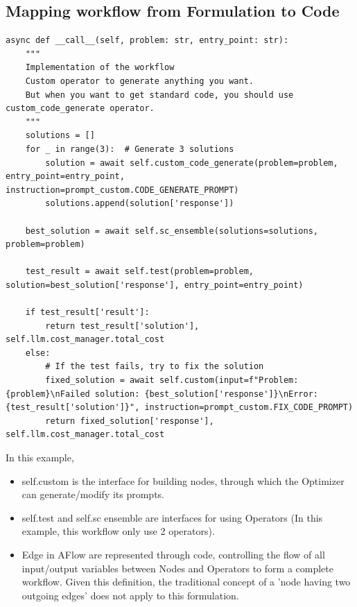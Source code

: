 \documentclass{article} %
\newcommand{\model}{{\sc AFlow}\xspace}
\theoremstyle{plain}
\theoremstyle{definition}
\theoremstyle{remark}
\begin{document}
\subsection{Mapping workflow from Formulation to Code}

\begin{tcolorbox}[title={\textbf{\small An example of Workflow}}, boxrule=1pt, arc=0mm, colback=black!5!white, colframe=black!75!white, breakable, before skip=10pt, after skip=10pt, pad at break=2mm, parbox=false] \begin{verbatim}
async def __call__(self, problem: str, entry_point: str):
    """
    Implementation of the workflow
    Custom operator to generate anything you want.
    But when you want to get standard code, you should use custom_code_generate operator.
    """
    solutions = []
    for _ in range(3):  # Generate 3 solutions
        solution = await self.custom_code_generate(problem=problem, entry_point=entry_point, instruction=prompt_custom.CODE_GENERATE_PROMPT)
        solutions.append(solution['response'])
    
    best_solution = await self.sc_ensemble(solutions=solutions, problem=problem)
    
    test_result = await self.test(problem=problem, solution=best_solution['response'], entry_point=entry_point)
    
    if test_result['result']:
        return test_result['solution'], self.llm.cost_manager.total_cost
    else:
        # If the test fails, try to fix the solution
        fixed_solution = await self.custom(input=f"Problem: {problem}\nFailed solution: {best_solution['response']}\nError: {test_result['solution']}", instruction=prompt_custom.FIX_CODE_PROMPT)
        return fixed_solution['response'], self.llm.cost_manager.total_cost
\end{verbatim}
\end{tcolorbox}

In this example,
\begin{itemize}[leftmargin=20pt]
    \item self.custom is the interface for building nodes, through which the Optimizer can generate/modify its prompts.    
    \item self.test and self.sc ensemble are interfaces for using Operators (In this example, this workflow only use 2 operators).
    \item Edge in \model are represented through code, controlling the flow of all input/output variables between Nodes and Operators to form a complete workflow. Given this definition, the traditional concept of a 'node having two outgoing edges' does not apply to this formulation.
\end{itemize}
\end{document}
